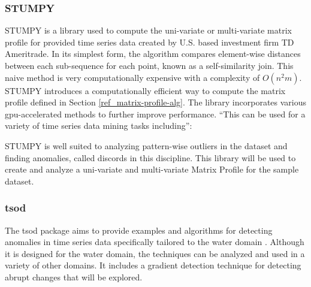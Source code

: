 \subsubsection{STUMPY}
STUMPY is a library used to compute the uni-variate or multi-variate matrix profile for provided time series data created by U.S. based investment firm TD Ameritrade. In its simplest form, the algorithm compares element-wise distances between each sub-sequence for each point, known as a self-similarity join. This naive method is very computationally expensive with a complexity of $O(n^2m)$. STUMPY introduces a computationally efficient way to compute the matrix profile defined in Section \ref{ref_matrix-profile-alg}. The library incorporates various gpu-accelerated methods to further improve performance. \enquote{This can be used for a variety of time series data mining tasks including}\parencite{law2019stumpy}: 
STUMPY is well suited to analyzing pattern-wise outliers in the dataset and finding anomalies, called discords in this discipline. This library will be used to create and analyze a uni-variate and multi-variate Matrix Profile for the sample dataset. 

\subsubsection{tsod}

The tsod package aims to provide examples and algorithms for detecting anomalies in time series data specifically tailored to the water domain \parencite{tsod}. Although it is designed for the water domain, the techniques can be analyzed and used in a variety of other domains. It includes a gradient detection technique for detecting abrupt changes that will be explored.

